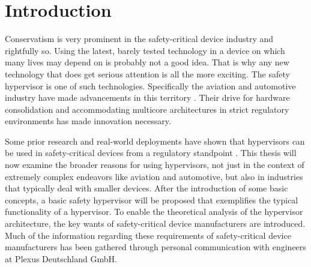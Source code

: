 
\chapter{Introduction} %

\label{Chapter1} %


\newcommand{\keyword}[1]{\textbf{#1}}
\newcommand{\bold}[1]{\textbf{#1}}
\newcommand{\tabhead}[1]{\textbf{#1}}
\newcommand{\code}[1]{\texttt{#1}}
\newcommand{\file}[1]{\texttt{\bfseries#1}}
\newcommand{\option}[1]{\texttt{\itshape#1}}

\newcommand{\mfg}{manufacturer}

Conservatism is very prominent in the safety-critical device industry and rightfully so. Using the latest, barely tested technology in a device on which many lives may depend on is probably not a good idea. That is why any new technology that does get serious attention is all the more exciting. The safety hypervisor is one of such technologies. Specifically the aviation and automotive industry have made advancements in this territory \cite{reinhardt2014embedded} \cite{vanderleest2015mpsoc}. Their drive for hardware consolidation and accommodating multicore architectures in strict regulatory environments has made innovation necessary.

Some prior research and real-world deployments have shown that hypervisors can be used in safety-critical devices from a regulatory standpoint \cite{larrucea2015modular}.
This thesis will now examine the broader reasons for using hypervisors, not just in the context of extremely complex endeavors like aviation and automotive, but also in industries that typically deal with smaller devices. After the introduction of some basic concepts, a basic safety hypervisor will be proposed that exemplifies the typical functionality of a hypervisor. To enable the theoretical analysis of the hypervisor architecture, the key wants of safety-critical device manufacturers are introduced. Much of the information regarding these requirements of safety-critical device manufacturers has been gathered through personal communication with engineers at Plexus Deutschland GmbH.

